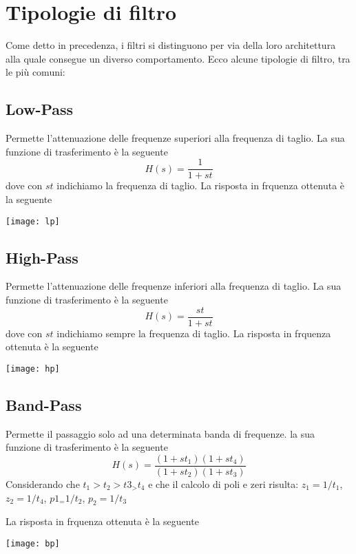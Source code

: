 \section{Tipologie di filtro}
Come detto in precedenza, i filtri si distinguono per via della loro architettura alla quale consegue un diverso comportamento. Ecco alcune tipologie di filtro, tra le più comuni:
\subsection{Low-Pass}
Permette l’attenuazione delle frequenze superiori alla frequenza di taglio.
La sua funzione di trasferimento è la seguente
\begin{equation}
H(s)=\frac{1}{1+st}
\end{equation}
dove con $st$ indichiamo la frequenza di taglio.
La risposta in frquenza ottenuta è la seguente
\begin{center}
\texttt{[image: lp]}
\end{center}
\subsection{High-Pass}
Permette l’attenuazione delle frequenze inferiori alla frequenza di taglio.
La sua funzione di trasferimento è la seguente
\begin{equation}
H(s)=\frac{st}{1+st}
\end{equation}
dove con $st$ indichiamo sempre la frequenza di taglio.
La risposta in frquenza ottenuta è la seguente
\begin{center}
\texttt{[image: hp]}
\end{center}
\subsection{Band-Pass}
Permette il passaggio solo ad una determinata banda di frequenze.
la sua funzione di trasferimento è la seguente
\begin{equation}
H(s)=\frac{(1+st_1)(1+st_4)}{(1+st_2)(1+st_3)}
\end{equation}
Considerando che $t_1>t_2>t3_>t_4$ e che il calcolo di poli e zeri risulta: $z_1=1/t_1$, $z_2=1/t_4$, $p1_=1/t_2$, $p_2=1/t_3$

La risposta in frquenza ottenuta è la seguente
\begin{center}
\texttt{[image: bp]}
\end{center}


